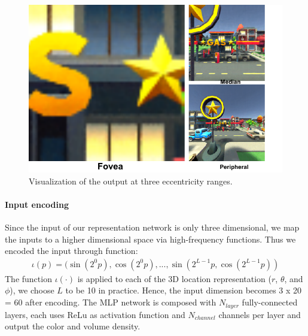 \begin{figure}[htb]
    \centering
    \includegraphics[width=0.96\linewidth]{TOG/figs/layers_together_zh.pdf}%
    \caption{Visualization of the output at three eccentricity ranges.}
    \label{fig:method:eccentricity}
\end{figure}


\paragraph{Input encoding}
Since the input of our representation network is only three dimensional, we map the inputs to a higher dimensional space via high-frequency functions.  
Thus we encoded the input through function:
\begin{align}
\iota (p) = (\sin(2^0 p), \cos(2^0 p), ..., \sin(2^{L-1}p, \cos(2^{L-1}p))
\label{eqn:inputencode}
\end{align}
The function $\iota (\cdot)$ is applied to each of the 3D location representation ($r$, $\theta$, and $\phi$), we choose $L$ to be 10 in practice. Hence, the input dimension becomes 3 x 20 = 60 after encoding. The MLP network is composed with $N_{layer}$ fully-connected layers, each uses ReLu as activation function and $N_{channel}$ channels per layer and output the color and volume density.

